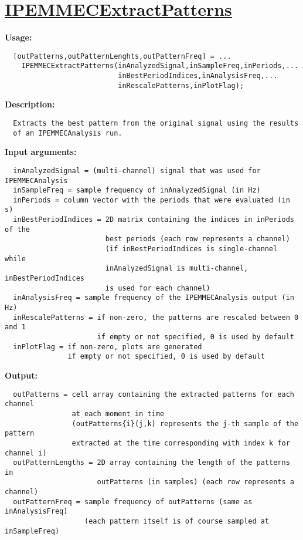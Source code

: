 \newpage
\section*{\hyperlink{Concepts:IPEMMECExtractPatterns}{IPEMMECExtractPatterns}}
\hypertarget{FuncRef:IPEMMECExtractPatterns}{}

\textbf{Usage:}
\begin{verbatim}  [outPatterns,outPatternLenghts,outPatternFreq] = ...
    IPEMMECExtractPatterns(inAnalyzedSignal,inSampleFreq,inPeriods,...
                           inBestPeriodIndices,inAnalysisFreq,...
                           inRescalePatterns,inPlotFlag);

\end{verbatim}
\textbf{Description:}
\begin{verbatim}  Extracts the best pattern from the original signal using the results
  of an IPEMMECAnalysis run.

\end{verbatim}
\textbf{Input arguments:}
\begin{verbatim}  inAnalyzedSignal = (multi-channel) signal that was used for IPEMMECAnalysis
  inSampleFreq = sample frequency of inAnalyzedSignal (in Hz)
  inPeriods = column vector with the periods that were evaluated (in s)
  inBestPeriodIndices = 2D matrix containing the indices in inPeriods of the
                        best periods (each row represents a channel)
                        (if inBestPeriodIndices is single-channel while
                        inAnalyzedSignal is multi-channel, inBestPeriodIndices
                        is used for each channel)
  inAnalysisFreq = sample frequency of the IPEMMECAnalysis output (in Hz)
  inRescalePatterns = if non-zero, the patterns are rescaled between 0 and 1
                      if empty or not specified, 0 is used by default
  inPlotFlag = if non-zero, plots are generated
               if empty or not specified, 0 is used by default

\end{verbatim}
\textbf{Output:}
\begin{verbatim}  outPatterns = cell array containing the extracted patterns for each channel
                at each moment in time
                (outPatterns{i}(j,k) represents the j-th sample of the pattern
                extracted at the time corresponding with index k for channel i)
  outPatternLengths = 2D array containing the length of the patterns in
                      outPatterns (in samples) (each row represents a channel)
  outPatternFreq = sample frequency of outPatterns (same as inAnalysisFreq)
                   (each pattern itself is of course sampled at inSampleFreq)

\end{verbatim}
